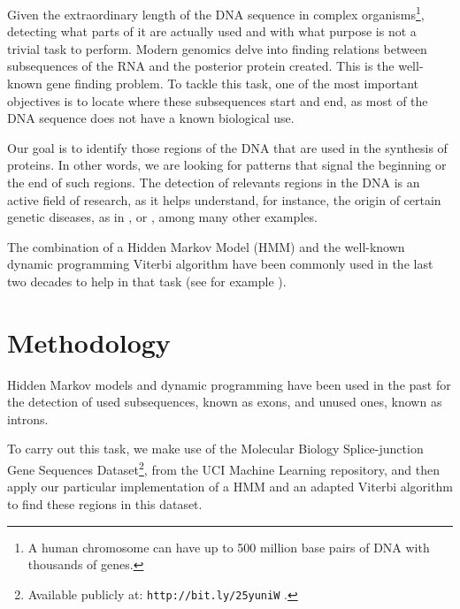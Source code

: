 \documentclass[a4paper, 11pt]{article} %
\begin{document}
Given the extraordinary length of the DNA sequence in complex organisms\footnote{A human chromosome can have up to 500 million base pairs of DNA with thousands of genes.}, detecting what parts of it are actually used and with what purpose is not a trivial task to perform. Modern genomics delve into finding relations between subsequences of the RNA and the posterior protein created. This is the well-known gene finding problem. To tackle this task, one of the most important objectives is to locate where these subsequences start and end, as most of the DNA sequence does not have a known biological use.

Our goal is to identify those regions of the DNA that are used in the synthesis of proteins. In other words, we are looking for patterns that signal the beginning or the end of such regions. The detection of relevants regions in the DNA is an active field of research, as it helps understand, for instance, the origin of certain genetic diseases, as in \cite{scheper}, or \cite{calon}, among many other examples.

The combination of a Hidden Markov Model (HMM) and the well-known dynamic programming Viterbi algorithm have been commonly used in the last two decades to help in that task (see for example \cite{henderson}).

\section*{Methodology}

Hidden Markov models and dynamic programming have been used in the past for the detection of used subsequences, known as exons, and unused ones, known as introns. 

To carry out this task, we make use of the Molecular Biology Splice-junction Gene Sequences Dataset\footnote{Available publicly at: \texttt{http://bit.ly/25yuniW} \cite{lichman}.}, from the UCI Machine Learning repository, and then apply our particular implementation of a HMM and an adapted Viterbi algorithm to find these regions in this dataset.
\end{document}

